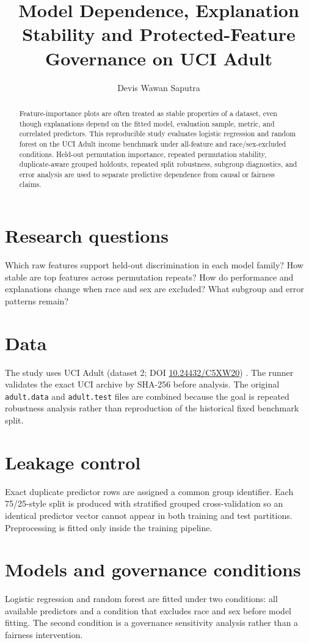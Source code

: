 \documentclass[11pt]{article}
\title{Model Dependence, Explanation Stability and Protected-Feature Governance on UCI Adult}
\author{Devis Wawan Saputra}
\date{}
\begin{document}
\maketitle

\begin{abstract}
Feature-importance plots are often treated as stable properties of a dataset, even though explanations depend on the fitted model, evaluation sample, metric, and correlated predictors. This reproducible study evaluates logistic regression and random forest on the UCI Adult income benchmark under all-feature and race/sex-excluded conditions. Held-out permutation importance, repeated permutation stability, duplicate-aware grouped holdouts, repeated split robustness, subgroup diagnostics, and error analysis are used to separate predictive dependence from causal or fairness claims.
\end{abstract}

\section{Research questions}
Which raw features support held-out discrimination in each model family? How stable are top features across permutation repeats? How do performance and explanations change when race and sex are excluded? What subgroup and error patterns remain?

\section{Data}
The study uses UCI Adult (dataset 2; DOI \href{https://doi.org/10.24432/C5XW20}{10.24432/C5XW20}) \cite{uciAdult}. The runner validates the exact UCI archive by SHA-256 before analysis. The original \texttt{adult.data} and \texttt{adult.test} files are combined because the goal is repeated robustness analysis rather than reproduction of the historical fixed benchmark split.

\section{Leakage control}
Exact duplicate predictor rows are assigned a common group identifier. Each 75/25-style split is produced with stratified grouped cross-validation so an identical predictor vector cannot appear in both training and test partitions. Preprocessing is fitted only inside the training pipeline.

\section{Models and governance conditions}
Logistic regression and random forest are fitted under two conditions: all available predictors and a condition that excludes race and sex before model fitting. The second condition is a governance sensitivity analysis rather than a fairness intervention.
\end{document}
